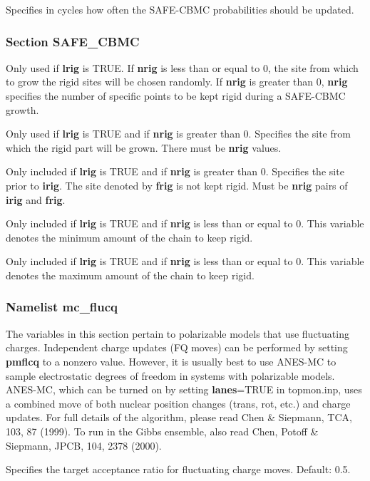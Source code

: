 \documentclass[12pt,letterpaper]{article}
\begin{document}
 Specifies in cycles how often the
SAFE-CBMC probabilities should be updated.

\subsubsection{Section \textbf{SAFE\_CBMC}}
 Only used if {\bf lrig} is TRUE. If
{\bf nrig} is less than or equal to 0, the site from which
to grow the rigid sites will be chosen randomly. If
{\bf nrig} is greater than 0, {\bf nrig} specifies the
number of specific points to be kept rigid during a
SAFE-CBMC growth.

 Only used if {\bf lrig} is TRUE and if
{\bf nrig} is greater than 0. Specifies the site from which
the rigid part will be grown. There must be \textbf{nrig}
values.

 Only included if {\bf lrig} is TRUE and
if {\bf nrig} is greater than 0. Specifies the site prior to
{\bf irig}. The site denoted by {\bf frig} is not kept
rigid. Must be {\bf nrig} pairs of {\bf irig} and {\bf
  frig}.

 Only included if {\bf lrig} is TRUE
and if {\bf nrig} is less than or equal to 0. This variable
denotes the minimum amount of the chain to keep rigid.

 Only included if {\bf lrig} is TRUE
and if {\bf nrig} is less than or equal to 0. This variable
denotes the maximum amount of the chain to keep rigid.

\subsubsection{Namelist \textbf{mc\_flucq}}

The variables in this section pertain to polarizable models that use
fluctuating charges. Independent charge updates (FQ moves) can
be performed by setting {\bf pmflcq} to a nonzero value. However, it
is usually best to use ANES-MC to sample electrostatic
degrees of freedom in systems with polarizable models.
ANES-MC, which can be turned on by setting {\bf lanes}=TRUE in topmon.inp,
uses a combined move of both nuclear position changes (trans, rot, etc.) 
and charge updates. For full details of the algorithm, please read 
Chen \& Siepmann, TCA, 103, 87 (1999). To run in the Gibbs ensemble,
also read Chen, Potoff \& Siepmann, JPCB, 104, 2378 (2000).

 Specifies the target acceptance ratio
for fluctuating charge moves. Default: 0.5.
\end{document}
